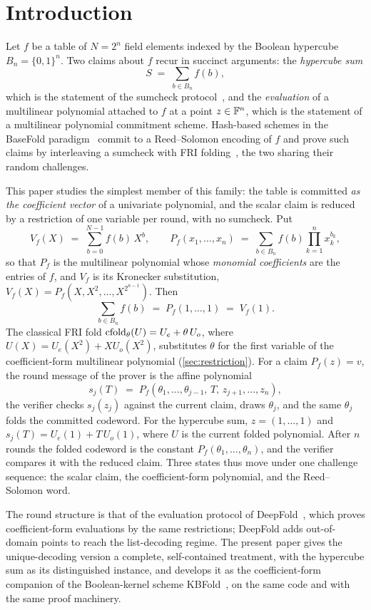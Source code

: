 \section{Introduction}\label{sec:intro}

Let $f$ be a table of $N = 2^n$ field elements indexed by the Boolean hypercube $B_n = \{0,1\}^n$.
Two claims about $f$ recur in succinct arguments: the \emph{hypercube sum}
\[
  S \;=\; \sum_{b \in B_n} f(b),
\]
which is the statement of the sumcheck protocol~\cite{LFKN92}, and the \emph{evaluation} of a multilinear polynomial attached to $f$ at a point $z \in \mathbb{F}^n$, which is the statement of a multilinear polynomial commitment scheme.
Hash-based schemes in the BaseFold paradigm~\cite{ZCF24} commit to a Reed--Solomon encoding of $f$ and prove such claims by interleaving a sumcheck with FRI folding~\cite{BBHR18}, the two sharing their random challenges.

This paper studies the simplest member of this family: the table is committed \emph{as the coefficient vector} of a univariate polynomial, and the scalar claim is reduced by a restriction of one variable per round, with no sumcheck.
Put
\[
  V_f(X) \;=\; \sum_{b=0}^{N-1} f(b)\, X^{b},
  \qquad
  P_f(x_1,\dots,x_n) \;=\; \sum_{b \in B_n} f(b) \prod_{k=1}^{n} x_k^{b_k},
\]
so that $P_f$ is the multilinear polynomial whose \emph{monomial coefficients} are the entries of $f$, and $V_f$ is its Kronecker substitution, $V_f(X) = P_f(X, X^2, \dots, X^{2^{n-1}})$.
Then
\[
  \sum_{b \in B_n} f(b) \;=\; P_f(1,\dots,1) \;=\; V_f(1).
\]
The classical FRI fold $\mathrm{cfold}_\theta(U) = U_e + \theta\, U_o$, where $U(X) = U_e(X^2) + X U_o(X^2)$, substitutes $\theta$ for the first variable of the coefficient-form multilinear polynomial (\cref{sec:restriction}).
For a claim $P_f(z) = v$, the round message of the prover is the affine polynomial
\[
  s_j(T) \;=\; P_{f}(\theta_1,\dots,\theta_{j-1},\, T,\, z_{j+1},\dots,z_n),
\]
the verifier checks $s_j(z_j)$ against the current claim, draws $\theta_j$, and the same $\theta_j$ folds the committed codeword.
For the hypercube sum, $z = (1,\dots,1)$ and $s_j(T) = U_e(1) + T\, U_o(1)$, where $U$ is the current folded polynomial.
After $n$ rounds the folded codeword is the constant $P_f(\theta_1,\dots,\theta_n)$, and the verifier compares it with the reduced claim.
Three states thus move under one challenge sequence: the scalar claim, the coefficient-form polynomial, and the Reed--Solomon word.

The round structure is that of the evaluation protocol of DeepFold~\cite{GLHQTZ25}, which proves coefficient-form evaluations by the same restrictions; DeepFold adds out-of-domain points to reach the list-decoding regime.
The present paper gives the unique-decoding version a complete, self-contained treatment, with the hypercube sum as its distinguished instance, and develops it as the coefficient-form companion of the Boolean-kernel scheme KBFold~\cite{Mkh26}, on the same code and with the same proof machinery.

